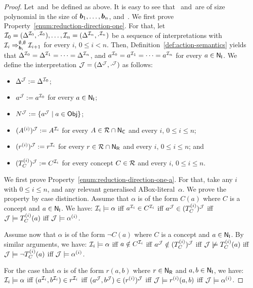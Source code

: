 \begin{proof}
    Let~\Ared and~\Tred be defined as above.  It is easy to see that~\Ared
    and~\Tred are of size polynomial in the size of $\boldsymbol b_1,\dots,\boldsymbol b_n$,
    and~\Rmc.
    We first prove Property~\eqref{enum:reduction-direction-one}.  For that, let
    $\mathcal{I}_0=(\Delta^{\mathcal{I}_0},\cdot^{\mathcal{I}_0}),\dots,\mathcal{I}_n=(\Delta^{\mathcal{I}_n},\cdot^{\mathcal{I}_n})$
    be a sequence of interpretations with
    $\mathcal{I}_i\Rightarrow_{\boldsymbol b_i}^{\emptyset,\emptyset}\mathcal{I}_{i+1}$ for every $i$,
    $0\le i<n$.  Then, Definition~\ref{def:action-semantics} yields that
    $\Delta^{\mathcal{I}_0}=\Delta^{\mathcal{I}_1}=\dots=\Delta^{\mathcal{I}_n}$, and
    $a^{\mathcal{I}_0}=a^{\mathcal{I}_1}=\dots=a^{\mathcal{I}_n}$ for every $a\in\mathsf{N_I}$.
    We define the interpretation $\mathcal{J}=(\Delta^\mathcal{J},\cdot^\mathcal{J})$ as follows:
    \begin{itemize}
        \item $\Delta^\mathcal{J}:=\Delta^{\mathcal{I}_0}$;
        \item $a^\mathcal{J}:=a^{\mathcal{I}_0}$ for every $a\in\mathsf{N_I}$;
        \item $N^\mathcal{J}:=\{a^\mathcal{J}\mid a\in\mathsf{Obj}\}$;
        \item $(A^{(i)})^\mathcal{J}:=A^{\mathcal{I}_i}$ for every $A\in\mathcal{R}\cap\mathsf{N_C}$ and every
            $i$, $0\le i\le n$;
        \item $(r^{(i)})^\mathcal{J}:=r^{\mathcal{I}_i}$ for every $r\in\mathcal{R}\cap\mathsf{N_R}$ and every
            $i$, $0\le i\le n$; and
        \item $(T_C^{(i)})^\mathcal{J}:=C^{\mathcal{I}_i}$ for every concept $C\in\mathcal{R}$ and
            every $i$, $0\le i\le n$.
    \end{itemize}
    We first prove Property~\eqref{enum:reduction-direction-one-a}.  For that,
    take any $i$ with $0\le i\le n$, and any relevant generalised
    ABox-literal~$\alpha$.  We prove the property by case distinction.  Assume
    that $\alpha$ is of the form $C(a)$ where $C$ is a concept and $a\in\mathsf{N_I}$.
    We have: $\mathcal{I}_i\models\alpha$ iff $a^{\mathcal{I}_i}\in C^{\mathcal{I}_i}$ iff
    $a^\mathcal{J}\in(T_C^{(i)})^\mathcal{J}$ iff $\mathcal{J}\models T_C^{(i)}(a)$ iff
    $\mathcal{J}\models\alpha^{(i)}$.

    Assume now that $\alpha$ is of the form $\lnot C(a)$ where $C$ is a concept
    and $a\in\mathsf{N_I}$.  By similar arguments, we have: $\mathcal{I}_i\models\alpha$ iff
    $a\notin C^{\mathcal{I}_i}$ iff $a^\mathcal{J}\notin(T_C^{(i)})^\mathcal{J}$ iff
    $\mathcal{J}\not\models T_C^{(i)}(a)$ iff $\mathcal{J}\models\lnot T_C^{(i)}(a)$ iff
    $\mathcal{J}\models\alpha^{(i)}$.

    For the case that $\alpha$ is of the form $r(a,b)$ where $r\in\mathsf{N_R}$ and
    $a,b\in\mathsf{N_I}$, we have: $\mathcal{I}_i\models\alpha$ iff
    $(a^{\mathcal{I}_i},b^{\mathcal{I}_i})\in r^{\mathcal{I}_i}$ iff
    $(a^\mathcal{J},b^\mathcal{J})\in(r^{(i)})^\mathcal{J}$ iff $\mathcal{J}\models r^{(i)}(a,b)$ iff
    $\mathcal{J}\models\alpha^{(i)}$.


\end{proof}
